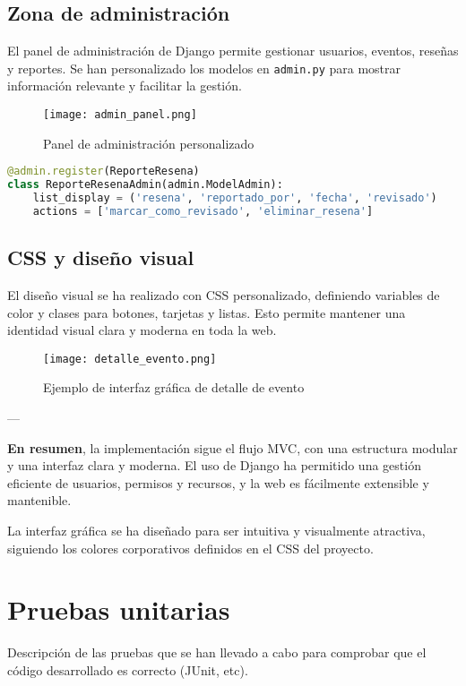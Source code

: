 \subsection{Zona de administración}

El panel de administración de Django permite gestionar usuarios, eventos, reseñas y reportes. Se han personalizado los modelos en \texttt{admin.py} para mostrar información relevante y facilitar la gestión.

\begin{figure}[!htb]
    \centering
    \texttt{[image: admin\_panel.png]}
    \caption{Panel de administración personalizado}
\end{figure}

\begin{lstlisting}[language=Python, caption={Registro de modelos en el admin}]
@admin.register(ReporteResena)
class ReporteResenaAdmin(admin.ModelAdmin):
    list_display = ('resena', 'reportado_por', 'fecha', 'revisado')
    actions = ['marcar_como_revisado', 'eliminar_resena']
\end{lstlisting}

\subsection{CSS y diseño visual}

El diseño visual se ha realizado con CSS personalizado, definiendo variables de color y clases para botones, tarjetas y listas. Esto permite mantener una identidad visual clara y moderna en toda la web.

\begin{figure}[!htb]
    \centering
    \texttt{[image: detalle\_evento.png]}
    \caption{Ejemplo de interfaz gráfica de detalle de evento}
\end{figure}

---

\textbf{En resumen}, la implementación sigue el flujo MVC, con una estructura modular y una interfaz clara y moderna. El uso de Django ha permitido una gestión eficiente de usuarios, permisos y recursos, y la web es fácilmente extensible y mantenible.

La interfaz gráfica se ha diseñado para ser intuitiva y visualmente atractiva, siguiendo los colores corporativos definidos en el CSS del proyecto.
\section{Pruebas unitarias}
Descripción de las pruebas que se han llevado a cabo para comprobar que el código
desarrollado es correcto (JUnit, etc).
